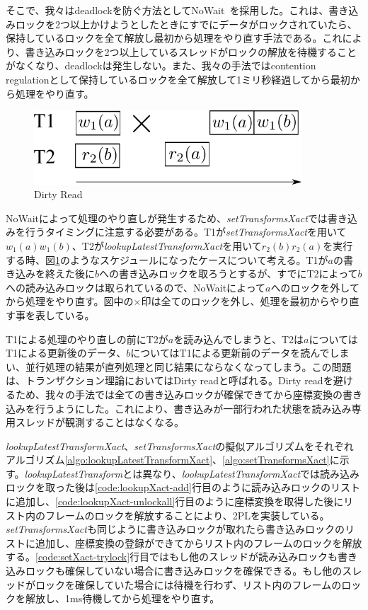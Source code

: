 \documentclass[a4paper]{jreport}	%
\begin{document}

そこで、我々はdeadlockを防ぐ方法としてNoWait~\cite{nowait}を採用した。これは、書き込みロックを2つ以上かけようとしたときにすでにデータがロックされていたら、保持しているロックを全て解放し最初から処理をやり直す手法である。これにより、書き込みロックを2つ以上しているスレッドがロックの解放を待機することがなくなり、deadlockは発生しない。また、我々の手法ではcontention regulationとして保持しているロックを全て解放して1ミリ秒経過してから最初から処理をやり直す。

\begin{figure}[h] 
\centering
\includegraphics[width=10cm]{dirty-read}
\caption{Dirty Read}
\label{fig:dirty-read}
\end{figure}


NoWaitによって処理のやり直しが発生するため、\textit{setTransformsXact}では書き込みを行うタイミングに注意する必要がある。T1が\textit{setTransformsXact}を用いて$w_1(a)w_1(b)$、T2が\textit{lookupLatestTransformXact}を用いて$r_2(b)r_2(a)$を実行する時、図\ref{fig:dirty-read}のようなスケジュールになったケースについて考える。T1が$a$の書き込みを終えた後に$b$への書き込みロックを取ろうとするが、すでにT2によって$b$への読み込みロックは取られているので、NoWaitによって$a$へのロックを外してから処理をやり直す。図中の$\times$印は全てのロックを外し、処理を最初からやり直す事を表している。

T1による処理のやり直しの前にT2が$a$を読み込んでしまうと、T2は$a$についてはT1による更新後のデータ、$b$についてはT1による更新前のデータを読んでしまい、並行処理の結果が直列処理と同じ結果にならなくなってしまう。この問題は、トランザクション理論においてはDirty readと呼ばれる。Dirty readを避けるため、我々の手法では全ての書き込みロックが確保できてから座標変換の書き込みを行うようにした。これにより、書き込みが一部行われた状態を読み込み専用スレッドが観測することはなくなる。

\textit{lookupLatestTransformXact}、\textit{setTransformsXact}の擬似アルゴリズムをそれぞれアルゴリズム\ref{algo:lookupLatestTransformXact}、\ref{algo:setTransformsXact}に示す。\textit{lookupLatestTransform}とは異なり、\textit{lookupLatestTransformXact}では読み込みロックを取った後は\ref{code:lookupXact-add}行目のように読み込みロックのリストに追加し、\ref{code:lookupXact-unlockall}行目のように座標変換を取得した後にリスト内のフレームのロックを解放することにより、2PLを実装している。\textit{setTransformsXact}も同じように書き込みロックが取れたら書き込みロックのリストに追加し、座標変換の登録ができてからリスト内のフレームのロックを解放する。\ref{code:setXact-trylock}行目ではもし他のスレッドが読み込みロックも書き込みロックも確保していない場合に書き込みロックを確保できる。もし他のスレッドがロックを確保していた場合には待機を行わず、リスト内のフレームのロックを解放し、1ms待機してから処理をやり直す。
\end{document}
